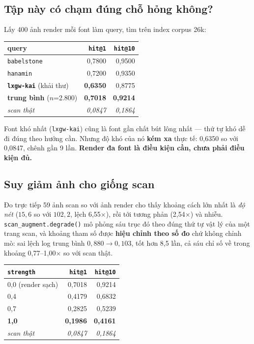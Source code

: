 \documentclass[11pt,a4paper]{article}
\newcommand{\code}[1]{\texttt{#1}}
\begin{document}
\subsection{Tập này có chạm đúng chỗ hỏng không?}

Lấy 400 ảnh render mỗi font làm query, tìm trên index corpus 26k:

\begin{center}
\begin{tabular}{lrr}
\toprule
query & \code{hit@1} & \code{hit@10} \\
\midrule
\code{babelstone} & 0,7800 & 0,9500 \\
\code{hanamin} & 0,7200 & 0,9350 \\
\textbf{\code{lxgw-kai}} (khải thư) & \textbf{0,6350} & 0,8775 \\
\textbf{trung bình} ($n$=2.800) & \textbf{0,7018} & \textbf{0,9214} \\
\emph{scan thật} & \emph{0,0847} & \emph{0,1864} \\
\bottomrule
\end{tabular}
\end{center}

Font khó nhất (\code{lxgw-kai}) cũng là font gần chất bút lông nhất --- thứ tự khó dễ đi đúng theo
hướng cần. Nhưng độ khó của nó \textbf{kém xa} thực tế: 0,6350 so với 0,0847, chênh gần 9 lần.
\textbf{Render đa font là điều kiện cần, chưa phải điều kiện đủ.}

\subsection{Suy giảm ảnh cho giống scan}

Đo trực tiếp 59 ảnh scan so với ảnh render cho thấy khoảng cách lớn nhất là \emph{độ nét}
($15{,}6$ so với $102{,}2$, lệch 6,55$\times$), rồi tới tương phản (2,54$\times$) và nhiễu.
\code{scan\_augment.degrade()} mô phỏng sáu trục đó theo đúng thứ tự vật lý của một trang scan, và
khoảng tham số được \textbf{hiệu chỉnh theo số đo} chứ không chỉnh mò: sai lệch log trung bình
$0{,}880 \to 0{,}103$, tốt hơn 8,5 lần, cả sáu chỉ số về trong khoảng 0,77--1,00$\times$ so với scan
thật.

\begin{center}
\begin{tabular}{lrr}
\toprule
\code{strength} & \code{hit@1} & \code{hit@10} \\
\midrule
0,0 (render sạch) & 0,7018 & 0,9214 \\
0,4 & 0,4179 & 0,6832 \\
0,7 & 0,2825 & 0,5239 \\
\textbf{1,0} & \textbf{0,1986} & \textbf{0,4161} \\
\emph{scan thật} & \emph{0,0847} & \emph{0,1864} \\
\bottomrule
\end{tabular}
\end{center}
\end{document}
